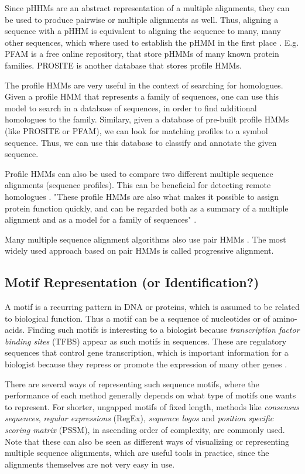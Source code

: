 \documentclass{article}
\begin{document}
Since pHHMs are an abstract representation of a multiple alignments, they can be used to produce pairwise or multiple alignments as well. Thus, aligning a sequence with a pHHM is equivalent to aligning the sequence to many, many other sequences, which where used to establish the pHMM in the first place \cite{Christianini2006}. E.g. PFAM is a free online repository, that store pHMMs of many known protein families. PROSITE is another database that stores profile HMMs. 

The profile HMMs are very useful in the context of searching for homologues. Given a profile HMM that represents a family of sequences, one can use this model to search in a database of sequences, in order to find additional homologues to the family. Similary, given a database of pre-built profile HMMs (like PROSITE or PFAM), we can look for matching profiles to a symbol sequence. Thus, we can use this database to classify and annotate the given sequence. 

Profile HMMs can also be used to compare two different multiple sequence alignments (sequence profiles). This can be beneficial for detecting remote homologues \cite{Yoon2009}. "These proﬁle HMMs are also what makes it possible to assign protein function quickly, and can be regarded both as a summary of a multiple alignment and as a model for a family of sequences" \cite{Christianini2006}.

Many multiple sequence alignment algorithms also use pair HMMs \cite{Yoon2009}. The most widely used approach based on pair HMMs is called progressive alignment. 

\subsection{Motif Representation (or Identification?)}
A motif is a recurring pattern in DNA or proteins, which is assumed to be related to biological function. Thus a motif can be a sequence of nucleotides or of amino-acids. Finding such motifs is interesting to a biologist because \textit{transcription factor binding sites} (TFBS) appear as such motifs in sequences. These are regulatory sequences that control gene transcription, which is important information for a biologist because they repress or promote the expression of many other genes \cite{Christianini2006}.

There are several ways of representing such sequence motifs, where the performance of each method generally depends on what type of motifs one wants to represent. For shorter, ungapped motifs of fixed length, methods like \textit{consensus sequences}, \textit{regular expressions} (RegEx), \textit{sequence logos} and \textit{position specific scoring matrix} (PSSM), in ascending order of complexity, are commonly used. Note that these can also be seen as different ways of visualizing or representing multiple sequence alignments, which are useful tools in practice, since the alignments themselves are not very easy in use. 
\end{document}

